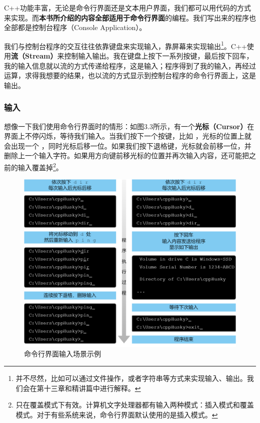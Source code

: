 C++功能丰富，无论是命令行界面还是文本用户界面，我们都可以用代码的方式来实现。而\textbf{本书所介绍的内容全部适用于命令行界面}的编程。我们写出来的程序也全部都是控制台程序（Console Application）。\par
我们与控制台程序的交互往往依靠键盘来实现输入，靠屏幕来实现输出\footnote{并不尽然，比如可以通过文件操作，或者字符串等方式来实现输入、输出。我们会在第十三章和精讲篇中进行解释。}。C++使用\textbf{流（Stream）}来控制输入输出。我在键盘上按下一系列按键，最后按下回车，我的输入信息就以流的方式传递给程序，这是输入；程序得到了我的输入，再经过运算，求得我想要的结果，也以流的方式显示到控制台程序的命令行界面上，这是输出。\par
\subsubsection*{输入}
想像一下我们使用命令行界面时的情形：如图3.3所示，有一个\textbf{光标（Cursor）}在界面上不停闪烁，等待我们输入。当我们按下一个按键，比如 \lstinline@d@，光标的位置上就会出现一个 \lstinline@d@，同时光标后移一位。如果我们按下退格键，光标就会前移一位，并删除上一个输入字符。如果用方向键前移光标的位置并再次输入内容，还可能把之前的输入覆盖掉\footnote{只在覆盖模式下有效。计算机文字处理器都有输入两种模式：插入模式和覆盖模式。对于有些系统来说，命令行界面默认使用的是插入模式。}。\par
\begin{figure}[htbp]
    \centering
    \includegraphics[width=\textwidth]{../images/generalized_parts/03_input_to_cmd_300.png}
    \caption{命令行界面输入场景示例}
\end{figure}
